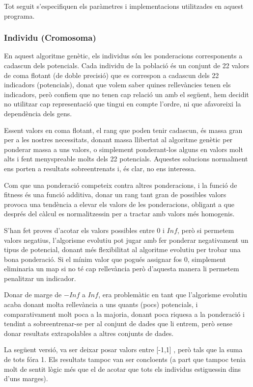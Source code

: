 Tot seguit s'especifiquen els paràmetres i implementacions utilitzades en aquest
programa.

\subsubsection{Individu (Cromosoma)}
\label{ssub:individu (cromosoma)}

En aquest algoritme genètic, els individus són les ponderacions corresponents a
cadascun dels potencials.  Cada individu de la població és un conjunt de 22 valors de
coma flotant (de doble precisió) que es correspon a cadascun dels 22 indicadors
(potencials),  donat que volem saber quines rellevàncies tenen els indicadors, però
confiem que no tenen cap relació un amb el següent, hem decidit no utilitzar cap
representació que tingui en compte l'ordre, ni que afavoreixi la dependència
dels gens. 

Essent valors en coma flotant, el rang que poden tenir cadascun, és massa gran
per a les nostres necessitats, donant massa llibertat al algoritme genètic per
ponderar massa a uns valors, o simplement ponderant-los alguns en valors molt alts
i fent menyspreable molts dels 22 potencials.  Aquestes solucions normalment ens
porten a resultats sobreentrenats i, és clar, no ens interessa.

Com que una ponderació competeix contra altres ponderacions, i la funció de
fitness és una funció additiva, donar un rang tant gran de possibles valors
provoca una tendència a elevar els valors de les ponderacions, obligant a que
després del càlcul es normalitzessin per a tractar amb valors més homogenis.

S'han fet proves d'acotar els valors possibles entre 0 i $Inf$, però si
permetem valors negatius, l'algorisme evolutiu pot jugar amb fer ponderar
negativament un tipus de potencial, donant més flexibilitat al algoritme
evolutiu per trobar una bona ponderació.  Si el mínim valor que pogués assignar
fos 0, simplement eliminaria un map si no té cap rellevància però d'aquesta
manera li permetem penalitzar un indicador.

Donar de marge de $-Inf$ a $Inf$, era problemàtic en tant que l'algorisme
evolutiu acaba donant molta rellevància a uns quants (pocs) potencials, i
comparativament molt poca a la majoria, donant poca riquesa a la ponderació i
tendint a sobreentrenar-se per al conjunt de dades que li entrem, però sense
donar resultats extrapolables a altres conjunts de dades.

La següent versió, va ser deixar posar valors entre [-1,1] , però tals que la
suma de tots fóra 1.  Els resultats tampoc van ser concloents (a part que tampoc
tenia molt de sentit lògic més que el de acotar que tots els individus
estiguessin dins d'uns marges).

